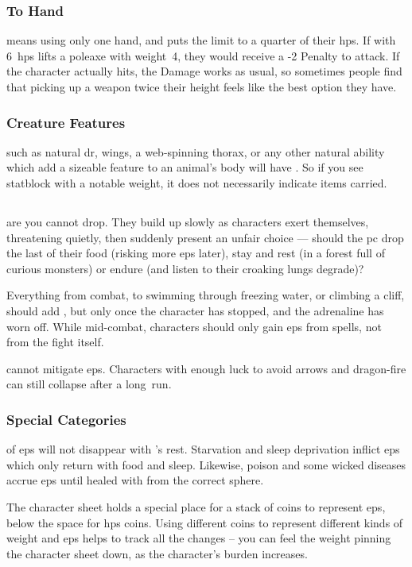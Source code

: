 \begin{multicols}{2}
\subsubsection{To Hand}
means using only one hand, and puts the limit to a quarter of their \glspl{hp}.
If  with 6~\glspl{hp} lifts a poleaxe with \gls{weight}~4, they would receive a -2 Penalty to attack.
If the character actually hits, the Damage works as usual, so sometimes people find that picking up a weapon twice their height feels like the best option they have.

\subsubsection{Creature Features}
such as natural \gls{dr}, wings, a web-spinning thorax, or any other natural ability which add a sizeable feature to an animal's body will have .
So if you see  \gls{statblock} with a notable \gls{weight}, it does not necessarily indicate items carried.

\subsection{}
\label{ep}

 are  you cannot drop.
They build up slowly as characters exert themselves, threatening quietly, then suddenly present an unfair choice --- should the \gls{pc} drop the last of their food (risking more \glspl{ep} later), stay and rest (in a forest full of curious \glspl{monster}) or endure (and listen to their croaking lungs degrade)?

Everything from combat, to swimming through freezing water, or climbing a cliff, should add , but only once the character has stopped, and the adrenaline has worn off.
While mid-combat, characters should only gain \glspl{ep} from spells, not from the fight itself.

 cannot mitigate \glspl{ep}.
Characters with enough luck to avoid arrows and dragon-fire can still collapse after a long~run.

\subsubsection{Special Categories}
of \glspl{ep} will not disappear with 's rest.
Starvation and sleep deprivation inflict \glspl{ep} which only return with food and sleep.
Likewise, poison and some wicked diseases accrue \glspl{ep} until healed with  from the correct \gls{sphere}.

The character sheet holds a special place for a stack of coins to represent \glspl{ep}, below the space for \glspl{hp} coins.
Using different coins to represent different kinds of \gls{weight} and \glspl{ep} helps to track all the changes -- you can feel the weight pinning the character sheet down, as the character's burden increases.

\end{multicols}

